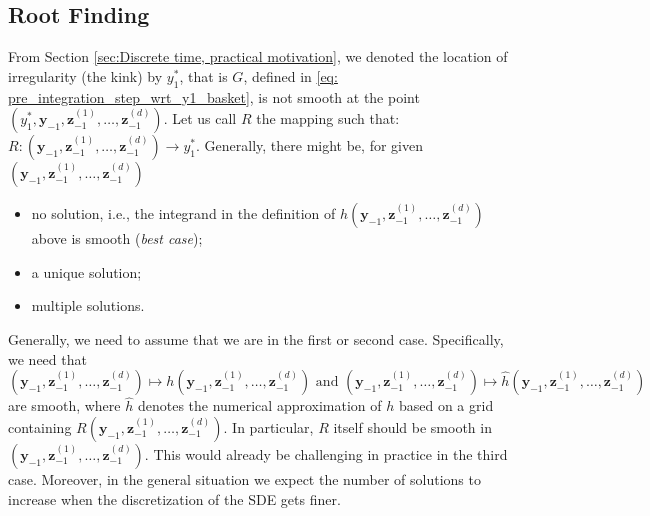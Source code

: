 \subsection{Root Finding}\label{sec: Root Finding}
From Section \ref{sec:Discrete time, practical motivation}, we denoted the location of irregularity (the kink) by $y_1^\ast$, that is $G$, defined in \eqref{eq: pre_integration_step_wrt_y1_basket}, is not smooth at the point $(y_1^\ast, \mathbf{y}_{-1},\mathbf{z}^{(1)}_{-1},\dots,\mathbf{z}^{(d)}_{-1})$. Let us call $R$ the mapping such that: $R: (\mathbf{y}_{-1},\mathbf{z}^{(1)}_{-1},\dots,\mathbf{z}^{(d)}_{-1} ) \rightarrow y_1^\ast$. Generally, there might be, for given $ (\mathbf{y}_{-1},\mathbf{z}^{(1)}_{-1},\dots,\mathbf{z}^{(d)}_{-1} )$
\begin{itemize}
	\item no solution, i.e., the integrand in the definition of $h( \mathbf{y}_{-1},\mathbf{z}^{(1)}_{-1},\dots,\mathbf{z}^{(d)}_{-1} )$ above
	is smooth (\textit{best case});
	\item a unique solution;
	\item multiple solutions.
\end{itemize}
Generally, we need to assume that we are in the first or second
case. Specifically, we need that
\begin{equation*}
	( \mathbf{y}_{-1},\mathbf{z}^{(1)}_{-1},\dots,\mathbf{z}^{(d)}_{-1} ) \mapsto h( \mathbf{y}_{-1},\mathbf{z}^{(1)}_{-1},\dots,\mathbf{z}^{(d)}_{-1} ) \text{ and } ( \mathbf{y}_{-1},\mathbf{z}^{(1)}_{-1},\dots,\mathbf{z}^{(d)}_{-1} ) \mapsto \hat{h}( \mathbf{y}_{-1},\mathbf{z}^{(1)}_{-1},\dots,\mathbf{z}^{(d)}_{-1} )
\end{equation*}
are smooth, where $\hat{h}$ denotes the numerical approximation of $h$ based
on a grid containing $R( \mathbf{y}_{-1},\mathbf{z}^{(1)}_{-1},\dots,\mathbf{z}^{(d)}_{-1} )$. In particular, $R$ itself should be smooth
in $( \mathbf{y}_{-1},\mathbf{z}^{(1)}_{-1},\dots,\mathbf{z}^{(d)}_{-1} )$. This would already be challenging in practice in the third case. Moreover, in the general situation we expect the number of solutions to increase when the discretization of the SDE gets finer.

